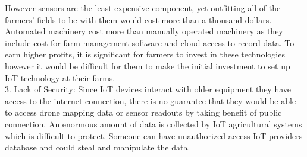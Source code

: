 \documentclass{report}
\begin{document}
\begin{multicols}{1}
\begin{itemize}
     However sensors are the least expensive component, yet outfitting all of the farmers’ fields to be with them would cost more than a thousand dollars. Automated machinery cost more than manually operated machinery as they include cost for farm management software and cloud access to record data. To earn higher profits, it is significant for farmers to invest in these technologies however it would be difficult for them to make the initial investment to set up IoT technology at their farms.\\ 
     3. Lack of Security: Since IoT devices interact with older equipment they have access to the internet connection, there is no guarantee that they would be able to access drone mapping data or sensor readouts by taking benefit of public connection. An enormous amount of data is collected by IoT agricultural systems which is difficult to protect. Someone can have unauthorized access IoT providers database and could steal and manipulate the data.

    \end{itemize}
    
\end{multicols}
\end{document}
